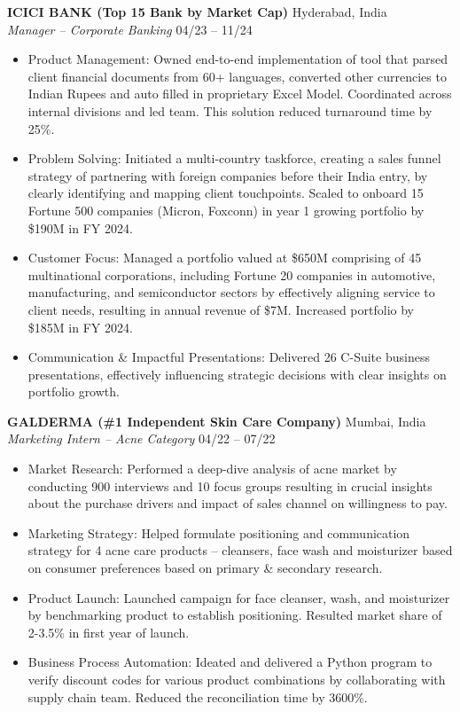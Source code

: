 \documentclass[10pt,letterpaper]{article}
\begin{document}
\noindent\textbf{ICICI BANK (Top 15 Bank by Market Cap)} \hfill Hyderabad, India\\
\textit{Manager – Corporate Banking} \hfill 04/23 -- 11/24
\begin{itemize}
  \item Product Management: Owned end-to-end implementation of tool that parsed client financial documents from 60+ languages, converted other currencies to Indian Rupees and auto filled in proprietary Excel Model. Coordinated across internal divisions and led team. This solution reduced turnaround time by 25\%.
  \item Problem Solving: Initiated a multi-country taskforce, creating a sales funnel strategy of partnering with foreign companies before their India entry, by clearly identifying and mapping client touchpoints. Scaled to onboard 15 Fortune 500 companies (Micron, Foxconn) in year 1 growing portfolio by \$190M in FY 2024.
  \item Customer Focus: Managed a portfolio valued at \$650M comprising of 45 multinational corporations, including Fortune 20 companies in automotive, manufacturing, and semiconductor sectors by effectively aligning service to client needs, resulting in annual revenue of \$7M. Increased portfolio by \$185M in FY 2024.
  \item Communication \& Impactful Presentations: Delivered 26 C-Suite business presentations, effectively influencing strategic decisions with clear insights on portfolio growth.
\end{itemize}

\noindent\textbf{GALDERMA (\#1 Independent Skin Care Company)} \hfill Mumbai, India\\
\textit{Marketing Intern – Acne Category} \hfill 04/22 -- 07/22
\begin{itemize}
  \item Market Research: Performed a deep-dive analysis of acne market by conducting 900 interviews and 10 focus groups resulting in crucial insights about the purchase drivers and impact of sales channel on willingness to pay.
  \item Marketing Strategy: Helped formulate positioning and communication strategy for 4 acne care products – cleansers, face wash and moisturizer based on consumer preferences based on primary \& secondary research.
  \item Product Launch: Launched campaign for face cleanser, wash, and moisturizer by benchmarking product to establish positioning. Resulted market share of 2-3.5\% in first year of launch.
  \item Business Process Automation: Ideated and delivered a Python program to verify discount codes for various product combinations by collaborating with supply chain team. Reduced the reconciliation time by 3600\%.
\end{itemize}
\end{document}
